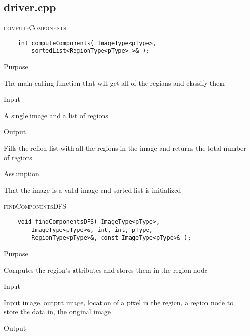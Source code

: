 \documentclass[pdftex, 11pt]{article}
\begin{document}
\subsection{driver.cpp}

\begin{description}

	\item{\textsc{computeComponents}}
\begin{lstlisting}
	int computeComponents( ImageType<pType>,
		sortedList<RegionType<pType> >& );
\end{lstlisting}
		\begin{description}

			\item{Purpose}

				The main calling function that will get all of the regions and classify them

			\item{Input}

				A single image and a list of regions

			\item{Output}

				Fills the refion list with all the regions in the image and returns the total number of regions

			\item{Assumption}

				That the image is a valid image and sorted list is initialized

		\end{description}
		
	\item{\textsc{findComponentsDFS}}
\begin{lstlisting}
	void findComponentsDFS( ImageType<pType>, 
		ImageType<pType>&, int, int, pType,
		RegionType<pType>&, const ImageType<pType>& );
\end{lstlisting}
		\begin{description}

			\item{Purpose}

				Computes the region's attributes and stores them in the region node

			\item{Input}

				Input image, output image, location of a pixel in the region, a region node to store the data in, the
				original image

			\item{Output}


\end{description}
\end{description}
\end{document}
